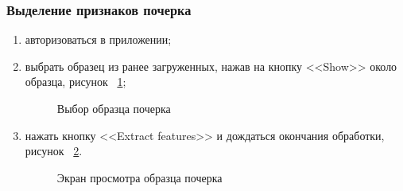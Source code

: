 \subsubsection{Выделение признаков почерка}
\label{sec:manpage:client_man:features}
\begin{enumerate}
    \item авторизоваться в приложении;
    \item выбрать образец из ранее загруженных, нажав на кнопку <<Show>> около образца, рисунок ~\ref{fig:manpage:client_man:show_button};
        \begin{figure}[ht]
            \centering
            \caption{Выбор образца почерка}
            \label{fig:manpage:client_man:show_button}
        \end{figure}
    \item нажать кнопку <<Extract features>> и дождаться окончания обработки, рисунок ~\ref{fig:manpage:client_man:extract_features}.
        \begin{figure}[ht]
            \centering
            \caption{Экран просмотра образца почерка}
            \label{fig:manpage:client_man:extract_features}
        \end{figure}
\end{enumerate}

